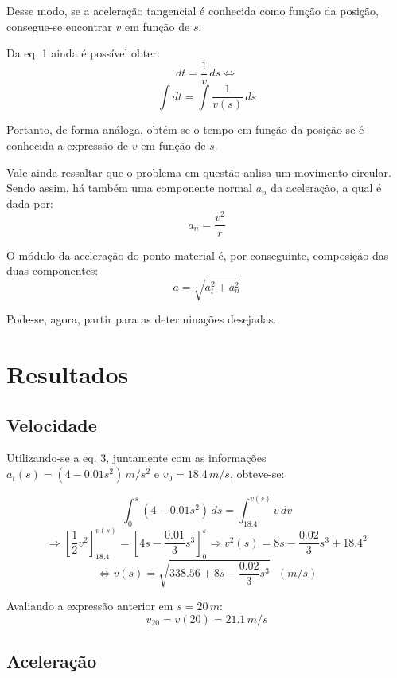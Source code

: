 \documentclass[a4paper, 12pt]{article}
\begin{document}
	Desse modo, se a aceleração tangencial é conhecida como função da posição, consegue-se encontrar $v$ em função de $s$.
	
	Da eq. 1 ainda é possível obter: $$dt=\dfrac{1}{v}\,ds\Longleftrightarrow$$
	\begin{equation}
		\int dt=\int \dfrac{1}{v(s)}\,ds
	\end{equation}
	
	Portanto, de forma análoga, obtém-se o tempo em função da posição se é conhecida a expressão de $v$ em função de $s$.
	
	Vale ainda ressaltar que o problema em questão anlisa um movimento circular. Sendo assim, há também uma componente normal
	$a_n$ da aceleração, a qual é dada por:
	\begin{equation}
		a_n=\dfrac{v^2}{r}
	\end{equation}
	
	\newpage
	
	O módulo da aceleração do ponto material é, por conseguinte, composição das duas componentes:
	\begin{equation}
		a=\sqrt{a_t^2+a_n^2}
	\end{equation}
	
	Pode-se, agora, partir para as determinações desejadas.	
	
	\section{Resultados}
	
	\subsection{Velocidade}
	
	Utilizando-se a eq. 3, juntamente com as informações $a_t(s)=(4-0.01s^2)\,m/s^2$ e $v_0=18.4\,m/s$, obteve-se:
	
	$$\int_0^s (4-0.01s^2)\,ds=\int_{18.4}^{v(s)} v\,dv$$
	$$\Longrightarrow \left[\frac{1}{2}v^2\right]_{18.4}^{v(s)}=\left[4s-\frac{0.01}{3}s^3\right]_{0}^{s}
	\Longrightarrow v^2(s)=8s-\frac{0.02}{3}s^3+18.4^2$$
	\begin{equation}
		\Longleftrightarrow v(s)=\sqrt{338.56+8s-\frac{0.02}{3}s^3}\,\,\,\,(m/s)
	\end{equation}
	
	Avaliando a expressão anterior em $s=20\,m$: $$v_{20}=v(20)=21.1\,m/s$$
	
	\subsection{Aceleração}
	
\end{document}
